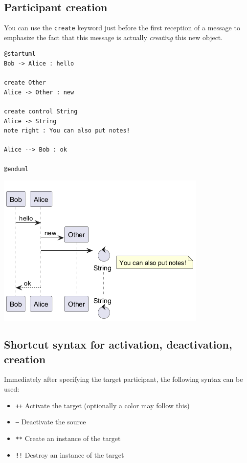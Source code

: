 %
%
\subsection{Participant creation}




You can use the \texttt{create} keyword just before the first
reception of a message to emphasize the fact that this message is
actually \textit{creating} this new object.
\begin{verbatim}
@startuml
Bob -> Alice : hello

create Other
Alice -> Other : new

create control String
Alice -> String
note right : You can also put notes!

Alice --> Bob : ok

@enduml
\end{verbatim}
\begin{center}
\includegraphics[scale=0.60]{imgw/img-5c1f3d97532da20d20cd4121e47f612a.png}
\end{center}


%
%
\subsection{Shortcut syntax for activation, deactivation, creation}




Immediately after specifying the target participant, the following syntax can be used:


\begin{itemize}
\item \texttt{++} Activate the target (optionally a color may follow this)
\item \texttt{--} Deactivate the source
\item \texttt{**} Create an instance of the target
\item \texttt{!!} Destroy an instance of the target
\end{itemize}


